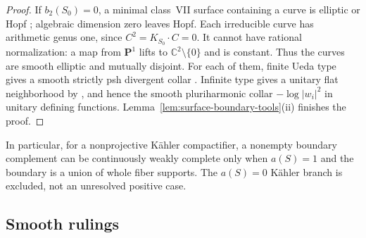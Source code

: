 \documentclass[11pt]{amsart}
\theoremstyle{definition}
\theoremstyle{remark}
\numberwithin{equation}{section}
\newcommand{\C}{\mathbb C}
\newcommand{\PP}{\mathbf P}
\begin{document}
\begin{proof}
If $b_2(S_0)=0$, a minimal class~VII surface containing a curve is
elliptic or Hopf \cite[p.~453]{Enoki}; algebraic dimension zero leaves
Hopf. Each irreducible curve has arithmetic genus one, since
$C^2=K_{S_0}\cdot C=0$. It cannot have rational normalization: a map
from $\PP^1$ lifts to $\C^2\setminus\{0\}$ and is constant. Thus the
curves are smooth elliptic and mutually disjoint. For each of them,
finite Ueda type gives a smooth strictly psh divergent collar
\cite[Theorem~2.5]{CLPT2018}. Infinite type gives a unitary flat
neighborhood by \cite[Theorem~1.6]{CFSTZ2026}, and hence the smooth
pluriharmonic collar $-\log|w_i|^2$ in unitary defining functions.
Lemma~\ref{lem:surface-boundary-tools}\textup{(ii)} finishes the proof.
\end{proof}

In particular, for a nonprojective K\"ahler compactifier, a nonempty
boundary complement can be continuously weakly complete only when
$a(S)=1$ and the boundary is a union of whole fiber supports. The
$a(S)=0$ K\"ahler branch is excluded, not an unresolved positive case.

\subsection{Smooth rulings}\label{subsec:smooth-rulings}
\end{document}
